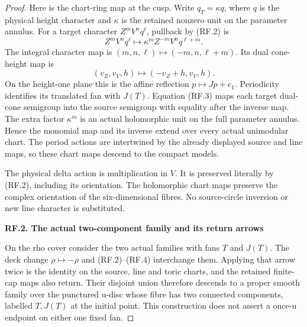 \begin{proof}
Here is the chart-ring map at the cusp. Write \(q_T=\kappa q\),
where \(q\) is the physical height character and \(\kappa\)
is the retained nonzero unit on the parameter annulus. For a target
character \(Z^mV^nq^\ell\), pullback by (RF.2) is
\[
          Z^mV^nq^\ell\longmapsto
             \kappa^m Z^{-m}V^nq^{\ell+m}.             \tag{RF.3}
\]
The integral character map is
\((m,n,\ell)\mapsto(-m,n,\ell+m)\). Its dual cone-height
map is
\[
                 (v_Z,v_V,h)\mapsto(-v_Z+h,v_V,h).
                                                               \tag{RF.4}
\]
On the height-one plane this is the affine reflection
\(p\mapsto Jp+e_1\). Periodicity identifies its translated fan
with \(J(T)\). Equation (RF.3) maps each target dual-cone
semigroup into the source semigroup with equality after the inverse
map. The extra factor \(\kappa^m\) is an actual holomorphic unit
on the full parameter annulus. Hence the monomial map and its
inverse extend over every actual unimodular chart. The period
actions are intertwined by the already displayed source and line
maps, so these chart maps descend to the compact models.

The physical delta action is multiplication in \(V\). It is
preserved literally by (RF.2), including its orientation. The
holomorphic chart maps preserve the complex orientation of the
six-dimensional fibres. No source-circle inversion or new line
character is substituted.

\par

\medskip\noindent\textbf{RF.2. The actual two-component family and its return arrows}

\par\nobreak

On the rho cover consider the two actual families with fans
\(T\) and \(J(T)\). The deck change \(\rho\mapsto-\rho\)
and (RF.2)--(RF.4) interchange them. Applying that arrow twice is
the identity on the source, line and toric charts, and the retained
finite-cap maps also return. Their disjoint union therefore descends
to a proper smooth family over the punctured u-disc whose fibre has
two connected components, labelled \(T,J(T)\) at the initial
point. This construction does not assert a once-u endpoint on either
one fixed fan.


\end{proof}
